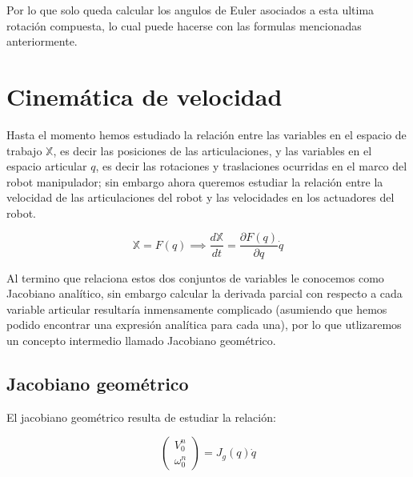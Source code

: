 \begin{multicols*}{3}
            Por lo que solo queda calcular los angulos de Euler asociados a esta ultima rotación compuesta, lo cual puede hacerse con las formulas mencionadas anteriormente.


    \section{Cinemática de velocidad}

        Hasta el momento hemos estudiado la relación entre las variables en el espacio de trabajo $\mathbb{X}$, es decir las posiciones de las articulaciones, y las variables en el espacio articular $q$, es decir las rotaciones y traslaciones ocurridas en el marco del robot manipulador; sin embargo ahora queremos estudiar la relación entre la velocidad de las articulaciones del robot y las velocidades en los actuadores del robot.

        \begin{equation}
            \mathbb{X} = F(q) \implies \frac{d \mathbb{X}}{dt} = \frac{\partial F(q)}{\partial q} \dot{q}
        \end{equation}

        Al termino que relaciona estos dos conjuntos de variables le conocemos como Jacobiano analítico, sin embargo calcular la derivada parcial con respecto a cada variable articular resultaría inmensamente complicado (asumiendo que hemos podido encontrar una expresión analítica para cada una), por lo que utlizaremos un concepto intermedio llamado Jacobiano geométrico.


        \subsection{Jacobiano geométrico}

            El jacobiano geométrico resulta de estudiar la relación:

            \begin{equation}
                \begin{pmatrix}
                    V_0^n \\
                    \omega_0^n
                \end{pmatrix} = J_g(q) \dot{q}
            \end{equation}


\end{multicols*}
